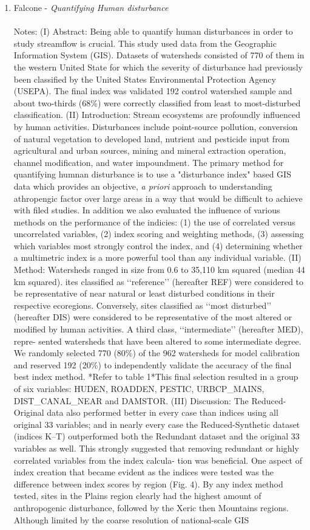 \documentclass{article}
\begin{document}
\begin{enumerate}
    \item Falcone - \textit{Quantifying Human disturbance}\\\\Notes: (I) Abstract: Being able to quantify human disturbances in order to study streamflow is crucial. This study used data from the Geographic Information System (GIS). Datasets of watersheds consisted of 770 of them in the western United State for which the severity of disturbance had previously been classified by the  United States Environmental Protection Agency (USEPA). The final index was validated 192 control watershed sample and about two-thirds (68\%) were correctly classified from least to most-disturbed classification. (II) Introduction: Stream ecosystems are profoundly influenced by human activities. Disturbances include point-source pollution, conversion of natural vegetation to developed land, nutrient and pesticide input from agricultural and urban sources, mining and mineral extraction operation, channel modification, and water impoundment. The primary method for quantifying humnan disturbance is to use a "disturbance index" based GIS data which provides an objective, \textit{a priori} approach to understanding athropengic factor over large areas in a way that would be difficult to achieve with filed studies. In addition we also evaluated the influence of various methods on the performance of the indicies: (1) the use of correlated versus uncorrelated variables, (2) index scoring and weighting methods, (3) assessing which variables most strongly control the index, and (4) determining whether a multimetric index is a more powerful tool than any individual variable. (II) Method: Watersheds ranged in size from 0.6 to 35,110 km squared (median 44 km squared). ites classified as ‘‘reference’’ (hereafter REF) were considered to be representative of near natural or least disturbed conditions in their respective ecoregions. Conversely, sites classified as ‘‘most disturbed’’ (hereafter DIS) were considered to be representative of the most altered or modified by human activities. A third class, ‘‘intermediate’’ (hereafter MED), repre- sented watersheds that have been altered to some intermediate degree. We randomly selected 770 (80\%) of the 962 watersheds for model calibration and reserved 192 (20\%) to independently validate the accuracy of the final best index method. *Refer to table 1*This final selection resulted in a group of six variables: HUDEN, ROADDEN, PESTIC, URBCP_MAINS, DIST_CANAL_NEAR and DAMSTOR. (III) Discussion: The Reduced-Original data also performed better in every case than indices using all original 33 variables; and in nearly every case the Reduced-Synthetic dataset (indices K–T) outperformed both the Redundant dataset and the original 33 variables as well. This strongly suggested that removing redundant or highly correlated variables from the index calcula- tion was beneficial. One aspect of index creation that became evident as the indices were tested was the difference between index scores by region (Fig. 4). By any index method tested, sites in the Plains region clearly had the highest amount of anthropogenic disturbance, followed by the Xeric then Mountains regions. Although limited by the coarse resolution of national-scale GIS 
\end{enumerate}
\end{document}
